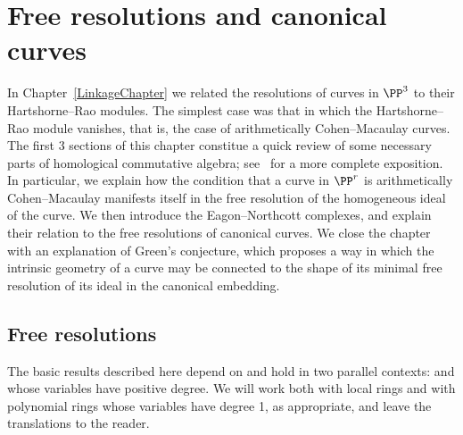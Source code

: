 

\chapter{Free resolutions and canonical curves}
\label{SyzygiesChapter}

\def\length{\mathrm{ length}}

In Chapter~\ref{LinkageChapter} we related the resolutions of curves
in $\PP^3$ to their Hartshorne--Rao modules. The simplest case was
that in which the Hartshorne--Rao module vanishes, that is, the case
of arithmetically Cohen--Macaulay curves. The first 3 sections of this
chapter constitue a quick review of some necessary parts of
 homological commutative algebra; see~\cite[Part III]{Eisenbud1995}
 for a more complete exposition. In particular, we
  explain how the condition that a curve
in $\PP^r$ is arithmetically Cohen--Macaulay manifests itself in the
free resolution of the homogeneous ideal of the curve. We then
introduce the Eagon--Northcott complexes, and explain their relation to
the free resolutions of canonical curves. We close the chapter with an
explanation of Green's conjecture, which proposes a way in which the
intrinsic geometry of a curve may be connected to the shape of its
minimal free resolution of its ideal in the canonical embedding.


\section{Free resolutions}


The basic results described here depend on 
 and hold 
%
 in two parallel contexts:
%
%
and
%
%
whose variables have positive degree. 
We will work both with local rings and with
polynomial rings whose variables have degree 1,
as appropriate, and leave the translations to the reader.



